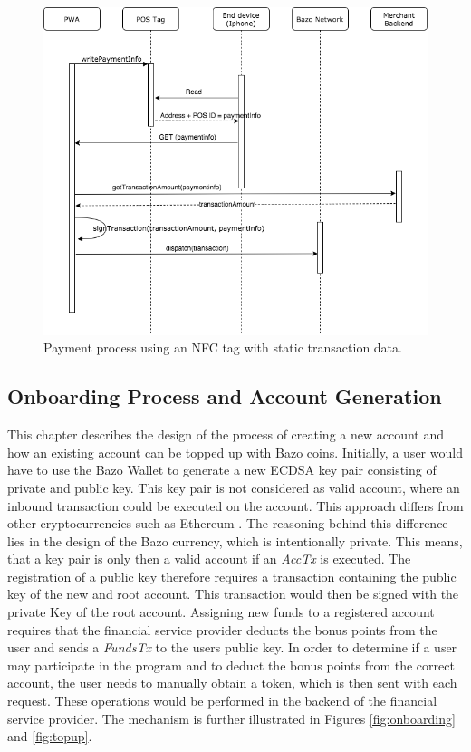 \begin{figure}
\centering
\includegraphics[width=1\textwidth]{diagrams/POS_flow.png}
\caption{\label{fig:POS}Payment process using an NFC tag with static transaction data.}
\end{figure}

\subsection{Onboarding Process and Account Generation}\label{onboarding}
This chapter describes the design of the process of creating a new account and how an existing account can be topped up with Bazo coins.
Initially, a user would have to use the Bazo Wallet to generate a new ECDSA key pair consisting of private and public key. This key pair is not considered as valid account, where an inbound transaction could be executed on the account. This approach differs from other cryptocurrencies such as Ethereum \cite{myethwallet}. The reasoning behind this difference lies in the design of the Bazo currency, which is intentionally private. This means, that a key pair is only then a valid account if an \textit{AccTx} is executed. The registration of a public key therefore requires a transaction containing the public key of the new and root account. This transaction would then be signed with the private Key of the root account.
Assigning new funds to a registered account requires that the financial service provider deducts the bonus points from the user and sends a \textit{FundsTx} to the users public key. In order to determine if a user may participate in the program and to deduct the bonus points from the correct account, the user needs to manually obtain a token, which is then sent with each request. These operations would be performed in the backend of the financial service provider. The mechanism is further illustrated in Figures \ref{fig:onboarding} and \ref{fig:topup}.


